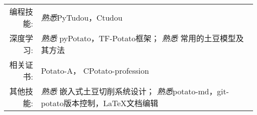
\renewcommand{\arraystretch}{1.1}

	\begin{tabular}{>{}r>{}p{17cm}} 
		\textsc{编程技能:}      & \emph{熟悉}PyTudou，Ctudou \\
		\textsc{深度学习:}   & \emph{熟悉} pyPotato，TF-Potato框架； \emph{熟悉} 常用的土豆模型及其方法 \\
		\textsc{相关证书:}	    &  Potato-A， CPotato-profession \\
		\textsc{其他技能:} & \emph{熟悉} 嵌入式土豆切削系统设计； \emph{熟悉}potato-md，git-potato版本控制，\LaTeX 文档编辑 \\
		
	\end{tabular}
	
	